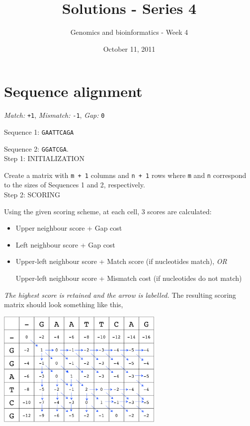 \documentclass[a4paper,11pt]{article}
\title{Solutions - Series 4}
\date{October 11, 2011}
\author{Genomics and bioinformatics - Week 4}
\begin{document}
\maketitle

\section{Sequence alignment}

\emph{Match:}  \texttt{+1}, \emph{Mismatch:} \texttt{-1}, \emph{Gap:} \texttt{0}

Sequence 1: \texttt{GAATTCAGA}

Sequence 2: \texttt{GGATCGA}.\\

Step 1: INITIALIZATION

Create a matrix with \texttt{m + 1} columns and \texttt{n + 1} rows where \texttt{m} and \texttt{n} correspond to the sizes of Sequences 1 and 2, respectively. \\


Step 2: SCORING

Using the given scoring scheme, at each cell, 3 scores are calculated:
\begin{itemize}
\item Upper neighbour score + Gap cost
\item Left neighbour score + Gap cost
\item Upper-left neighbour score + Match score (if nucleotides match), \emph{OR} 

Upper-left neighbour score + Mismatch cost (if nucleotides do not match)
\end{itemize}

\indent\emph{The highest score is retained and the arrow is labelled.} The resulting scoring matrix should look something like this, \\

\begin{center}
\includegraphics[width=0.6\textwidth]{scoring.png}\\
\end{center}
\end{document}
